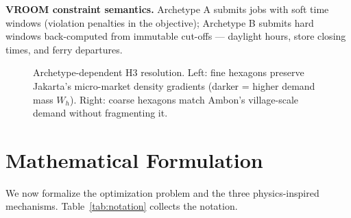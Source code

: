 \documentclass[11pt,a4paper,twocolumn]{article}
\newcommand{\hexcell}[4]{%
  \draw[draw=terraSlate!55, line width=0.4pt, fill=#4]
    ({#1+#3*cos(30)},{#2+#3*sin(30)}) --
    ({#1+#3*cos(90)},{#2+#3*sin(90)}) --
    ({#1+#3*cos(150)},{#2+#3*sin(150)}) --
    ({#1+#3*cos(210)},{#2+#3*sin(210)}) --
    ({#1+#3*cos(270)},{#2+#3*sin(270)}) --
    ({#1+#3*cos(330)},{#2+#3*sin(330)}) -- cycle;}
\newcommand{\hexat}[4]{%
  \pgfmathsetmacro{\hx}{(#1 + 0.5*mod(#2,2)) * 1.7320508 * #3}%
  \pgfmathsetmacro{\hy}{#2 * 1.5 * #3}%
  \hexcell{\hx}{\hy}{#3}{#4}}
\begin{document}
\textbf{VROOM constraint semantics.} Archetype A submits jobs with soft
time windows (violation penalties in the objective); Archetype B submits
hard windows back-computed from immutable cut-offs --- daylight hours,
store closing times, and ferry departures.

\begin{figure}[t]
  \centering
  \caption{Archetype-dependent H3 resolution. Left: fine hexagons preserve
    Jakarta's micro-market density gradients (darker = higher demand mass
    $W_h$). Right: coarse hexagons match Ambon's village-scale demand
    without fragmenting it.}
  \label{fig:hexres}
\end{figure}

\section{Mathematical Formulation}
\label{sec:math}

We now formalize the optimization problem and the three physics-inspired
mechanisms. Table~\ref{tab:notation} collects the notation.
\end{document}
